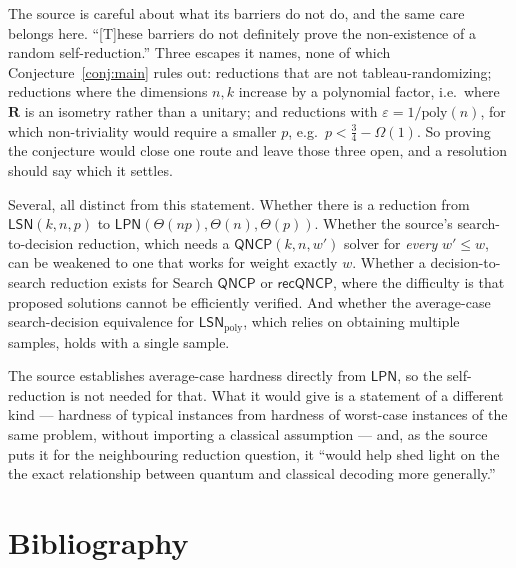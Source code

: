 \documentclass{conjura-conjecture}
\newcommand{\Om}{\Omega}
\newcommand{\eps}{\varepsilon}
\newcommand{\LSN}{\mathsf{LSN}}
\newcommand{\LPN}{\mathsf{LPN}}
\newcommand{\QNCP}{\mathsf{QNCP}}
\begin{document}
\begin{remark}\label{rem:scope}
The source is careful about what its barriers do not do, and the same
care belongs here. ``[T]hese barriers do not definitely prove the
non-existence of a random self-reduction.'' Three escapes it names, none
of which Conjecture~\ref{conj:main} rules out: reductions that are not
tableau-randomizing; reductions where the dimensions $n, k$ increase by a
polynomial factor, i.e.\ where $\mathbf{R}$ is an isometry rather than a
unitary; and reductions with $\eps = 1/\mathrm{poly}(n)$, for which
non-triviality would require a smaller $p$, e.g.\ $p < \frac{3}{4} -
\Om(1)$. So proving the conjecture would close one route and leave those
three open, and a resolution should say which it settles.
\end{remark}

\begin{remark}\label{rem:neighbours}
Several, all distinct from this statement. Whether there is a reduction
from $\LSN(k,n,p)$ to $\LPN(\Theta(np), \Theta(n), \Theta(p))$. Whether
the source's search-to-decision reduction, which needs a $\QNCP(k,n,w')$
solver for \emph{every} $w' \le w$, can be weakened to one that works for
weight exactly $w$. Whether a decision-to-search reduction exists for
Search $\QNCP$ or $\mathsf{recQNCP}$, where the difficulty is that
proposed solutions cannot be efficiently verified. And whether the
average-case search-decision equivalence for $\LSN_{\mathrm{poly}}$,
which relies on obtaining multiple samples, holds with a single sample.
\end{remark}

\begin{remark}\label{rem:why}
The source establishes average-case hardness directly from $\LPN$, so the
self-reduction is not needed for that. What it would give is a statement
of a different kind --- hardness of typical instances from hardness of
worst-case instances of the same problem, without importing a classical
assumption --- and, as the source puts it for the neighbouring reduction
question, it ``would help shed light on the the exact relationship between
quantum and classical decoding more generally.''
\end{remark}

\section{Bibliography}
\end{document}
